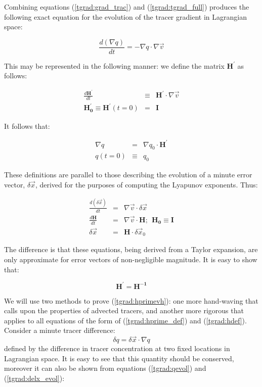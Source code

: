 \documentclass[12pt]{report}
\begin{document}
\begin{flushleft}
Combining equations (\ref{tgrad:grad_trac}) and (\ref{tgrad:tgrad_full}) produces
the following exact equation for the evolution of the tracer gradient in Lagrangian
space:

\begin{equation}
\frac{d (\nabla q)}{dt} = - \nabla q \cdot \nabla \vec v 
\end{equation}

This may be represented in the following manner:  we define the matrix $\boldsymbol{H^\prime}$
as follows:

\begin{eqnarray}
\frac{d \boldsymbol{H^\prime}}{dt} & \equiv & \boldsymbol{H^\prime} \cdot \nabla \vec v \\
\boldsymbol{H^\prime_0} \equiv \boldsymbol{H^\prime}(t=0) & = & \boldsymbol{I}\nonumber
\label{tgrad:hprime_def}
\end{eqnarray}

It follows that:

\begin{eqnarray}
\nabla q  & = & \nabla q_0 \cdot \boldsymbol{H^\prime} \label{tgrad:qevol}\\
q(t=0) & \equiv & q_0\nonumber
\end{eqnarray}

These definitions are parallel to those describing the evolution of a minute 
error vector, $\delta \vec x$, derived for the purposes of computing the
Lyapunov exponents.  Thus:

\begin{eqnarray}
\frac{d (\delta \vec x)}{dt} & = & \nabla \vec v \cdot \delta \vec x \label{tgrad:delx_evol}\\
\frac{d \boldsymbol H}{dt} & = & \nabla \vec v \cdot \boldsymbol H; ~~
 \boldsymbol {H_0} \equiv \boldsymbol{I} \label{tgrad:hdef}\\
\delta \vec x & = & \boldsymbol{H} \cdot \delta \vec x_0
\end{eqnarray}

The difference is that these equations, being derived from a Taylor expansion, are 
only approximate for error vectors of non-negligible magnitude.  It is easy to show that:

\begin{equation}
\boldsymbol{H^\prime} = \boldsymbol{H^{-1}}
\label{tgrad:hprimevh}
\end{equation}

We will use two methods to prove (\ref{tgrad:hprimevh}): one more hand-waving
that calls upon the properties of advected tracers, and another more rigorous that
applies to all equations of the form of (\ref{tgrad:hprime_def}) and (\ref{tgrad:hdef}).
\linebreak
\linebreak
Consider a minute tracer difference:
\begin{equation}
\delta q = \delta \vec x \cdot \nabla q
\end{equation}
defined by the difference 
in tracer concentration at two fixed locations in Lagrangian space.  It is
easy to see that this quantity should be conserved, moreover it can also 
be shown from equations (\ref{tgrad:qevol}) and (\ref{tgrad:delx_evol}):


\end{flushleft}
\end{document}
